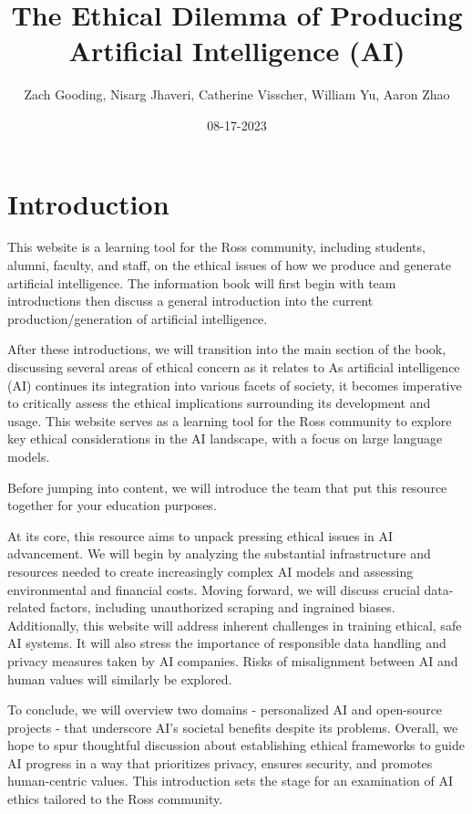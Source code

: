 \documentclass[
]{book}
\title{The Ethical Dilemma of Producing Artificial Intelligence (AI)}
\author{Zach Gooding, Nisarg Jhaveri, Catherine Visscher, William Yu, Aaron Zhao}
\date{08-17-2023}
\begin{document}
\maketitle

{
\setcounter{tocdepth}{1}
\tableofcontents
}
\hypertarget{introduction}{%
\chapter{Introduction}\label{introduction}}

This website is a learning tool for the Ross community, including students, alumni, faculty, and staff, on the ethical issues of how we produce and generate artificial intelligence. The information book will first begin with team introductions then discuss a general introduction into the current production/generation of artificial intelligence.

After these introductions, we will transition into the main section of the book, discussing several areas of ethical concern as it relates to As artificial intelligence (AI) continues its integration into various facets of society, it becomes imperative to critically assess the ethical implications surrounding its development and usage. This website serves as a learning tool for the Ross community to explore key ethical considerations in the AI landscape, with a focus on large language models.

Before jumping into content, we will introduce the team that put this resource together for your education purposes.

At its core, this resource aims to unpack pressing ethical issues in AI advancement. We will begin by analyzing the substantial infrastructure and resources needed to create increasingly complex AI models and assessing environmental and financial costs. Moving forward, we will discuss crucial data-related factors, including unauthorized scraping and ingrained biases.
Additionally, this website will address inherent challenges in training ethical, safe AI systems. It will also stress the importance of responsible data handling and privacy measures taken by AI companies. Risks of misalignment between AI and human values will similarly be explored.

To conclude, we will overview two domains - personalized AI and open-source projects - that underscore AI's societal benefits despite its problems. Overall, we hope to spur thoughtful discussion about establishing ethical frameworks to guide AI progress in a way that prioritizes privacy, ensures security, and promotes human-centric values. This introduction sets the stage for an examination of AI ethics tailored to the Ross community.
\end{document}
